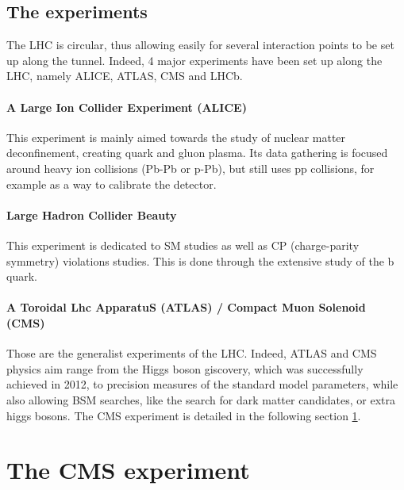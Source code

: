 \subsection{The experiments}

The LHC is circular, thus allowing easily for several interaction points to be set up along the tunnel. Indeed, 4 major experiments have been set up along the LHC, namely ALICE, ATLAS, CMS and LHCb.

\paragraph{A Large Ion Collider Experiment (ALICE)} This experiment is mainly aimed towards the study of nuclear matter deconfinement, creating quark and gluon plasma. Its data gathering is focused around heavy ion collisions (Pb-Pb or p-Pb), but still uses pp collisions, for example as a way to calibrate the detector.

\paragraph{Large Hadron Collider Beauty} This experiment is dedicated to SM studies as well as CP (charge-parity symmetry) violations studies. This is done through the extensive study of the b quark.

\paragraph{A Toroidal Lhc ApparatuS (ATLAS) / Compact Muon Solenoid (CMS)} Those are the generalist experiments of the LHC. Indeed, ATLAS and CMS physics aim range from the Higgs boson giscovery, which was successfully achieved in 2012, to precision measures of the standard model parameters, while also allowing BSM searches, like the search for dark matter candidates, or extra higgs bosons. The CMS experiment is detailed in the following section \ref{sec:CMS}.


\section{The CMS experiment}
\label{sec:CMS}

